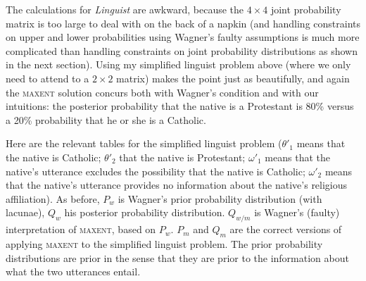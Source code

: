 \documentclass[11pt]{article}
\begin{document}
The calculations for \emph{Linguist} are awkward, because the
$4\times{}4$ joint probability matrix is too large to deal with on the
back of a napkin (and handling constraints on upper and lower
probabilities using Wagner's faulty assumptions is much more
complicated than handling constraints on joint probability
distributions as shown in the next section). Using my simplified
linguist problem above (where we only need to attend to a $2\times{}2$
matrix) makes the point just as beautifully, and again the
\textsc{maxent} solution concurs both with Wagner's condition and with
our intuitions: the posterior probability that the native is a
Protestant is 80\% versus a 20\% probability that he or she is a
Catholic. 

Here are the relevant tables for the simplified linguist problem
($\theta'_{1}$ means that the native is Catholic; $\theta'_{2}$ that
the native is Protestant; $\omega'_{1}$ means that the native's
utterance excludes the possibility that the native is Catholic;
$\omega'_{2}$ means that the native's utterance provides no
information about the native's religious affiliation). As before,
$P_{w}$ is Wagner's prior probability distribution (with lacunae),
$Q_{w}$ his posterior probability distribution. $Q_{w/m}$ is Wagner's
(faulty) interpretation of \textsc{maxent}, based on $P_{w}$. $P_{m}$
and $Q_{m}$ are the correct versions of applying \textsc{maxent} to
the simplified linguist problem. The prior probability distributions
are prior in the sense that they are prior to the information about
what the two utterances entail.

\medskip
\end{document}
